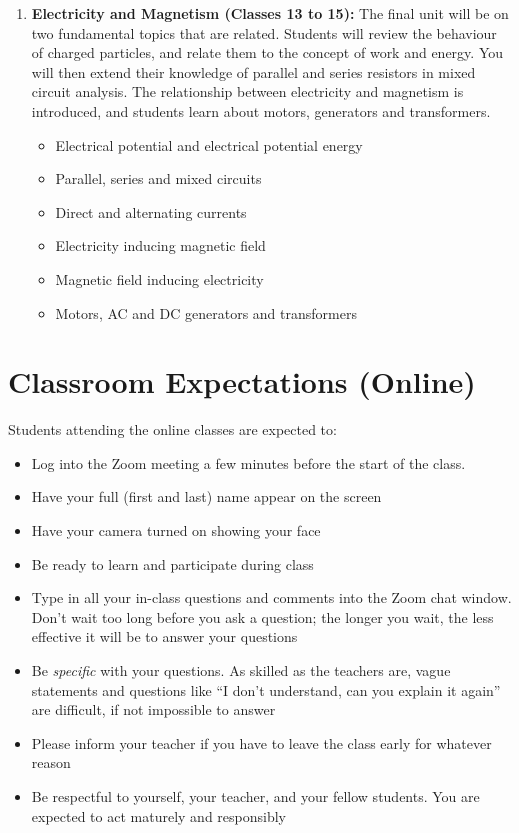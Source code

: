 \documentclass{../oss-handout}
\begin{document}
\begin{enumerate}[itemsep=.05ex,label={\textbf{\arabic*.}}]
\item\textbf{Electricity and Magnetism (Classes 13 to 15):} The final unit will
  be on two fundamental topics that are related. Students will review the
  behaviour of charged particles, and relate them to the concept of work and
  energy. You will then extend their knowledge of parallel and series resistors
  in mixed circuit analysis. The relationship between electricity and magnetism
  is introduced, and students learn about motors, generators and transformers.
  \begin{itemize}[nosep]
  \item Electrical potential and electrical potential energy
  \item Parallel, series and mixed circuits
  \item Direct and alternating currents
  \item Electricity inducing magnetic field
  \item Magnetic field inducing electricity
  \item Motors, AC and DC generators and transformers
  \end{itemize}
\end{enumerate}




\section*{Classroom Expectations (Online)}
Students attending the online classes are expected to:
\begin{itemize}[nosep]
\item Log into the Zoom meeting a few minutes before the start of the class.
\item Have your full (first and last) name appear on the screen
\item Have your camera turned on showing your face
\item Be ready to learn and participate during class
\item Type in all your in-class questions and comments into the Zoom chat
  window. Don't wait too long before you ask a question; the longer you wait,
  the less effective it will be to answer your questions
\item Be \emph{specific} with your questions. As skilled as the teachers are,
  vague statements and questions like ``I don't understand, can you explain it
  again'' are difficult, if not impossible to answer
\item Please inform your teacher if you have to leave the class early for
  whatever reason
\item Be respectful to yourself, your teacher, and your fellow students. You
  are expected to act maturely and responsibly
\end{itemize}
\end{document}
